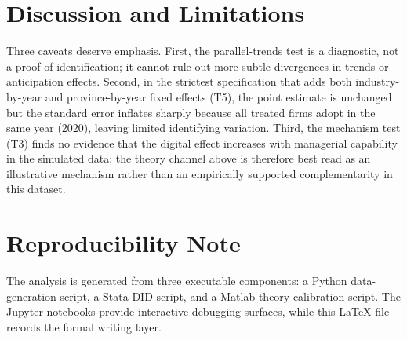 \documentclass[11pt]{article}
\begin{document}
\section{Discussion and Limitations}

Three caveats deserve emphasis. First, the parallel-trends test is a diagnostic, not a proof of identification; it cannot rule out more subtle divergences in trends or anticipation effects. Second, in the strictest specification that adds both industry-by-year and province-by-year fixed effects (T5), the point estimate is unchanged but the standard error inflates sharply because all treated firms adopt in the same year (2020), leaving limited identifying variation. Third, the mechanism test (T3) finds no evidence that the digital effect increases with managerial capability in the simulated data; the theory channel above is therefore best read as an illustrative mechanism rather than an empirically supported complementarity in this dataset.

\section{Reproducibility Note}

The analysis is generated from three executable components: a Python data-generation script, a Stata DID script, and a Matlab theory-calibration script. The Jupyter notebooks provide interactive debugging surfaces, while this \LaTeX{} file records the formal writing layer.
\end{document}

